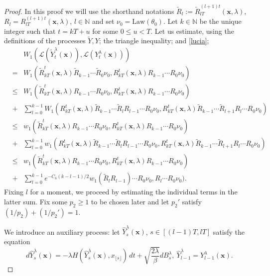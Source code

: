 \documentclass[a4paper,draft]{article}
\begin{document}
\begin{proof} In this proof
we will use the shorthand notations $\tilde{R}_l:=\tilde{R}_{lT}^{(l+1)t}(\mathbf{x},\lambda)$, 
$R_l={R}_{lT}^{(l+1)t}(\mathbf{x},\lambda)$, $l\in\mathbb{N}$
and set $\nu_0=\mathrm{Law}(\theta_0)$.
Let $k\in\mathbb{N}$ be the unique integer such that $t=kT+u$ for some
$0\leq u<T$. Let us estimate, using the definitions of the processes $\tilde{Y},Y$;
the triangle inequality; and \eqref{lucia};
\begin{eqnarray*}
& & W_1(\mathcal{L}(\tilde{Y}^{\lambda}_t(\mathbf{x})),
\mathcal{L}(Y^{\lambda}_t(\mathbf{x})))\\
&=& W_1(\tilde{R}^{t}_{kT}(\mathbf{x},\lambda)\tilde{R}_{k-1}\cdots \tilde{R}_0\nu_0,
{R}^{t}_{kT}(\mathbf{x},\lambda)R_{k-1}\cdots R_0\nu_0)\\
&\leq& W_1(\tilde{R}^{t}_{kT}(\mathbf{x},\lambda){R}_{k-1}\cdots R_0
\nu_0,
{R}^{t}_{kT}(\mathbf{x},\lambda){R}_{k-1}\cdots R_0\nu_0)\\ &+& \sum_{l=0}^{k-1}
W_1({R}^{t}_{kT}(\mathbf{x},\lambda)\tilde{R}_{k-1}\cdots \tilde{R}_l
R_{l-1}\cdots R_0
\nu_0,
{R}^{t}_{kT}(\mathbf{x},\lambda)\tilde{R}_{k-1}\cdots \tilde{R}_{l+1}
R_{l}\cdots R_0\nu_0)\\
&\leq& w_1(\tilde{R}^{t}_{kT}(\mathbf{x},\lambda){R}_{k-1}\cdots R_0
\nu_0,
{R}^{t}_{kT}(\mathbf{x},\lambda){R}_{k-1}\cdots R_0\nu_0)\\ &+& \sum_{l=0}^{k-1}
w_1({R}^{t}_{kT}(\mathbf{x},\lambda)\tilde{R}_{k-1}\cdots \tilde{R}_l
R_{l-1}\cdots R_0
\nu_0,
{R}^{t}_{kT}(\mathbf{x},\lambda)\tilde{R}_{k-1}\cdots \tilde{R}_{l+1}
R_{l}\cdots R_0\nu_0)\\
&\leq& w_1(\tilde{R}^{t}_{kT}(\mathbf{x},\lambda){R}_{k-1}\cdots R_0
\nu_0,
{R}^{t}_{kT}(\mathbf{x},\lambda){R}_{k-1}\cdots R_0\nu_0)\\ &+& 
\sum_{l=0}^{k-1} e^{-C_8(k-l-1)/2}
w_1(\tilde{R}_lR_{l-1})\cdots R_0
\nu_0,{R}_{l}
\cdots {R}_0\nu_0).
\end{eqnarray*}
Fixing $l$ for a moment, we proceed by estimating the individual terms in the latter sum.
Fix some $p_2\geq 1$ to be chosen later and let $p_2'$ satisfy $(1/p_2)+(1/p_2')=1$.

We introduce an auxiliary process: let
$\hat{Y}^{\lambda}_s(\mathbf{x})$, $s\in [(l-1)T,lT]$ satisfy the equation
$$
d\hat{Y}^{\lambda}_s(\mathbf{x})=-\lambda H(\hat{Y}^{\lambda}_s(\mathbf{x}),x_{\lfloor s\rfloor})\, dt+\sqrt{\frac{2\lambda}{\beta}}dB_s^{\lambda},\ \hat{Y}^{\lambda}_{l-1}=Y^{\lambda}_{l-1}(\mathbf{x}).
$$


\end{proof}
\end{document}
